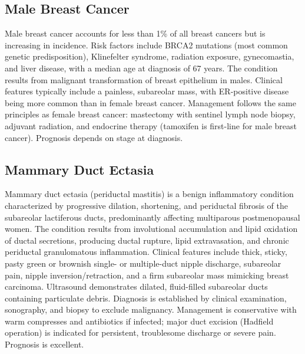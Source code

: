 \subsection{Male Breast Cancer}
\label{sec:Male Breast Cancer}
Male breast cancer accounts for less than 1\% of all breast cancers but is increasing in incidence. Risk factors include BRCA2 mutations (most common genetic predisposition), Klinefelter syndrome, radiation exposure, gynecomastia, and liver disease, with a median age at diagnosis of 67 years. The condition results from malignant transformation of breast epithelium in males. Clinical features typically include a painless, subareolar mass, with ER-positive disease being more common than in female breast cancer. Management follows the same principles as female breast cancer: mastectomy with sentinel lymph node biopsy, adjuvant radiation, and endocrine therapy (tamoxifen is first-line for male breast cancer). Prognosis depends on stage at diagnosis.

\subsection{Mammary Duct Ectasia}
\label{sec:Mammary Duct Ectasia}
Mammary duct ectasia (periductal mastitis) is a benign inflammatory condition characterized by progressive dilation, shortening, and periductal fibrosis of the subareolar lactiferous ducts, predominantly affecting multiparous postmenopausal women. The condition results from involutional accumulation and lipid oxidation of ductal secretions, producing ductal rupture, lipid extravasation, and chronic periductal granulomatous inflammation. Clinical features include thick, sticky, pasty green or brownish single- or multiple-duct nipple discharge, subareolar pain, nipple inversion/retraction, and a firm subareolar mass mimicking breast carcinoma. Ultrasound demonstrates dilated, fluid-filled subareolar ducts containing particulate debris. Diagnosis is established by clinical examination, sonography, and biopsy to exclude malignancy. Management is conservative with warm compresses and antibiotics if infected; major duct excision (Hadfield operation) is indicated for persistent, troublesome discharge or severe pain. Prognosis is excellent.

